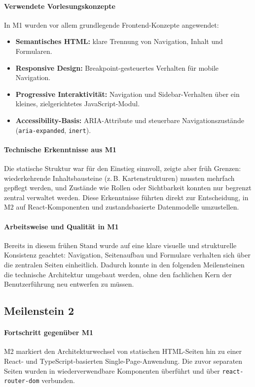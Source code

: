 \paragraph{Verwendete Vorlesungskonzepte}
In M1 wurden vor allem grundlegende Frontend-Konzepte angewendet:
\begin{itemize}
  \item \textbf{Semantisches HTML:} klare Trennung von Navigation, Inhalt und Formularen.
  \item \textbf{Responsive Design:} Breakpoint-gesteuertes Verhalten für mobile
  Navigation.
  \item \textbf{Progressive Interaktivität:} Navigation und Sidebar-Verhalten
  über ein kleines, zielgerichtetes JavaScript-Modul.
  \item \textbf{Accessibility-Basis:} ARIA-Attribute und steuerbare
  Navigationszustände (\texttt{aria-expanded}, \texttt{inert}).
\end{itemize}

\paragraph{Technische Erkenntnisse aus M1}
Die statische Struktur war für den Einstieg sinnvoll, zeigte aber früh Grenzen:
wiederkehrende Inhaltsbausteine (z.\,B. Kartenstrukturen) mussten mehrfach
gepflegt werden, und Zustände wie Rollen oder Sichtbarkeit konnten nur begrenzt
zentral verwaltet werden.
Diese Erkenntnisse führten direkt zur Entscheidung, in M2 auf React-Komponenten
und zustandsbasierte Datenmodelle umzustellen.

\paragraph{Arbeitsweise und Qualität in M1}
Bereits in diesem frühen Stand wurde auf eine klare visuelle und strukturelle
Konsistenz geachtet:
Navigation, Seitenaufbau und Formulare verhalten sich über die zentralen Seiten
einheitlich.
Dadurch konnte in den folgenden Meilensteinen die technische Architektur
umgebaut werden, ohne den fachlichen Kern der Benutzerführung neu entwerfen zu
müssen.

\subsection{Meilenstein 2}

\paragraph{Fortschritt gegenüber M1}
M2 markiert den Architekturwechsel von statischen HTML-Seiten hin zu einer
React- und TypeScript-basierten Single-Page-Anwendung.
Die zuvor separaten Seiten wurden in wiederverwendbare Komponenten
überführt und über \texttt{react-router-dom} verbunden.

